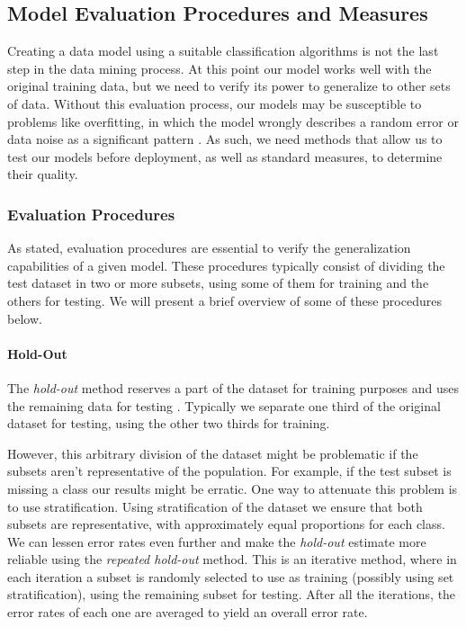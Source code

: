 \subsection{Model Evaluation Procedures and Measures}\label{sec:mineval}

Creating a data model using a suitable classification algorithms is not the last
step in the data mining process. At this point our model works well with the
original training data, but we need to verify its power to generalize to other
sets of data. Without this evaluation process, our models may be susceptible to
problems like overfitting, in which the model wrongly describes a random error
or data noise as a significant pattern \cite{han2006data}. As such, we need
methods that allow us to test our models before deployment, as well as standard
measures, to determine their quality.

\subsubsection*{Evaluation Procedures}

As stated, evaluation procedures are essential to verify the generalization
capabilities of a given model. These procedures typically consist of dividing
the test dataset in two or more subsets, using some of them for training and the
others for testing. We will present a brief overview of some of these procedures
below.

\paragraph{Hold-Out}

The \textit{hold-out} method reserves a part of the dataset for training
purposes and uses the remaining data for testing \cite{witten2011data}.
Typically we separate one third of the original dataset for testing, using the
other two thirds for training.

However, this arbitrary division of the dataset might be problematic if the
subsets aren't representative of the population. For example, if the test subset
is missing a class our results might be erratic. One way to attenuate this
problem is to use stratification. Using stratification of the dataset we ensure
that both subsets are representative, with approximately equal proportions for
each class. We can lessen error rates even further and make the
\textit{hold-out} estimate more reliable using the \textit{repeated hold-out}
method. This is an iterative method, where in each iteration a subset is
randomly selected to use as training (possibly using set stratification), using
the remaining subset for testing. After all the iterations, the error rates of
each one are averaged to yield an overall error rate.


